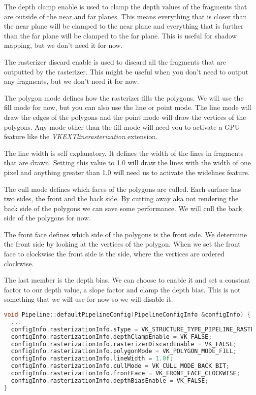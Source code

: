 \documentclass[12pt]{report} \usepackage{preamble}
\begin{document}
The depth clamp enable is used to clamp the depth values of the fragments that are outside of the near and far planes.
This means everything that is closer than the near plane will be clamped to the near plane and everything that is further
than the far plane will be clamped to the far plane. This is useful for shadow mapping, but we don't need it for now.

The rasterizer discard enable is used to discard all the fragments that are outputted by the rasterizer. This might be
useful when you don't need to output any fragments, but we don't need it for now.

The polygon mode defines how the rasterizer fills the polygons. We will use the fill mode for now, but you can also use
the line or point mode. The line mode will draw the edges of the polygons and the point mode will draw the vertices of the
polygons. Any mode other than the fill mode will need you to activate a \ac{GPU} feature like the
\textit{VK\textunderscore EXT\textunderscore line\textunderscore rasterization} extension.

The line width is self explanatory. It defines the width of the lines in fragments that are drawn. Setting this
value to 1.0 will draw the lines with the width of one pixel and anything greater than 1.0 will need us to activate
the widelines feature.

The cull mode defines which faces of the polygons are culled. Each surface has two sides, the front and the back side.
By cutting away aka not rendering the back side of the polygons we can save some performance. We will cull the back side
of the polygons for now.

The front face defines which side of the polygons is the front side. We determine the front side by looking at the
vertices of the polygon. When we set the front face to clockwise the front side is the side, where the vertices are
ordered clockwise.

The last member is the depth bias. We can choose to enable it and set a constant factor to our depth value, a slope factor
and clamp the depth bias. This is not something that we will use for now so we will disable it.

\begin{lstlisting}[language=C++]
void Pipeline::defaultPipelineConfig(PipelineConfigInfo &configInfo) {
  ...
  configInfo.rasterizationInfo.sType = VK_STRUCTURE_TYPE_PIPELINE_RASTERIZATION_STATE_CREATE_INFO;
  configInfo.rasterizationInfo.depthClampEnable = VK_FALSE;
  configInfo.rasterizationInfo.rasterizerDiscardEnable = VK_FALSE;
  configInfo.rasterizationInfo.polygonMode = VK_POLYGON_MODE_FILL;
  configInfo.rasterizationInfo.lineWidth = 1.0f;
  configInfo.rasterizationInfo.cullMode = VK_CULL_MODE_BACK_BIT;
  configInfo.rasterizationInfo.frontFace = VK_FRONT_FACE_CLOCKWISE;
  configInfo.rasterizationInfo.depthBiasEnable = VK_FALSE;
}
\end{lstlisting}
\end{document}
